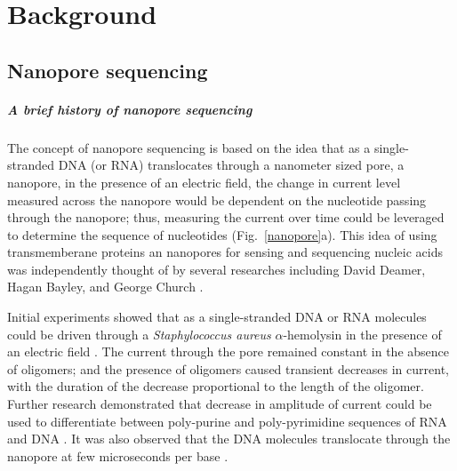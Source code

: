 \chapter{Background}
\label{ch2}

\section{Nanopore sequencing}

\paragraph{A brief history of nanopore sequencing}
The concept of nanopore sequencing is based on the idea that as a
single-stranded DNA (or RNA) translocates through a nanometer sized
pore, a nanopore, in the presence of an electric field, the change in
current level measured across the nanopore would be dependent on the
nucleotide passing through the nanopore; thus, measuring the current
over time could be leveraged to determine the sequence of nucleotides
(Fig.~\ref{nanopore}a).
%
This idea of using transmemberane proteins an nanopores for sensing and
sequencing nucleic acids was independently thought of by several
researches including David Deamer, Hagan Bayley, and George Church
\citep{deamer2016three,bayley2015nanopore,branton2010potential}.

Initial experiments showed that as a single-stranded DNA or RNA
molecules could be driven through a \emph{Staphylococcus aureus}
$\alpha$-hemolysin in the presence of an electric field
\citep{kasianowicz1996characterization}. The current through the pore
remained constant in the absence of oligomers; and the presence of
oligomers caused transient decreases in current, with the duration of
the decrease proportional to the length of the oligomer.
Further research demonstrated that decrease in amplitude of current
could be used to differentiate between poly-purine and poly-pyrimidine
sequences of RNA \citep{akeson1999microsecond} and DNA
\citep{meller2000rapid}. It was also observed that the DNA molecules
translocate through the nanopore at few microseconds per base
\citep{meller2000rapid}.

